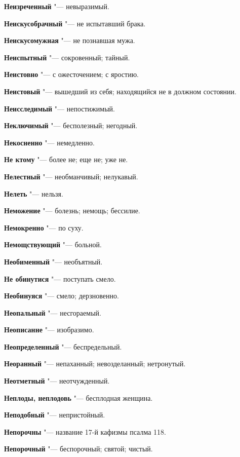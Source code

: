 \begin{mymulticols}
\noindent\textbf{Неизреченный} "--- невыразимый. 

\noindent\textbf{Неискусобрачный} "--- не испытавший брака. 

\noindent\textbf{Неискусомужная} "--- не познавшая мужа. 

\noindent\textbf{Неиспытный} "--- сокровенный; тайный. 

\noindent\textbf{Неистовно} "--- с ожесточением; с яростию. 

\noindent\textbf{Неистовый} "--- вышедший из себя; находящийся не в должном состоянии. 

\noindent\textbf{Неисследимый} "--- непостижимый. 

\noindent\textbf{Неключимый} "--- бесполезный; негодный. 

\noindent\textbf{Некосненно} "--- немедленно. 

\noindent\textbf{Не ктому} "--- более не; еще не; уже не. 

\noindent\textbf{Нелестный} "--- необманчивый; нелукавый. 

\noindent\textbf{Нелеть} "--- нельзя. 

\noindent\textbf{Неможение} "--- болезнь; немощь; бессилие. 

\noindent\textbf{Немокренно} "--- по суху. 

\noindent\textbf{Немощствующий} "--- больной. 

\noindent\textbf{Необименный} "--- необъятный. 

\noindent\textbf{Не обинутися} "--- поступать смело. 

\noindent\textbf{Необинуяся} "--- смело; дерзновенно. 

\noindent\textbf{Неопальный} "--- несгораемый. 

\noindent\textbf{Неописанне} "--- изобразимо. 

\noindent\textbf{Неопределенный} "--- беспредельный. 

\noindent\textbf{Неоранный} "--- непаханный; невозделанный; нетронутый. 

\noindent\textbf{Неотметный} "--- неотчужденный. 

\noindent\textbf{Неплоды, неплодовь} "--- бесплодная женщина. 

\noindent\textbf{Неподобный} "--- непристойный. 

\noindent\textbf{Непорочны} "--- название 17-й кафизмы псалма 118. 

\noindent\textbf{Непорочный} "--- беспорочный; святой; чистый. 


\end{mymulticols}
